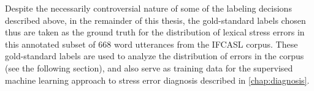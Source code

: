 		Despite the necessarily controversial nature of some of the labeling decisions described above, in the remainder of this thesis, the gold-standard labels chosen thus are taken as the ground truth for the distribution of lexical stress errors in this annotated subset of  668 word utterances from the IFCASL corpus. These gold-standard labels are used to analyze the distribution of errors in the corpus (see the following section), and also serve as training data for the supervised machine learning approach to stress error diagnosis described in  \cref{chap:diagnosis}. 
		
		
	
		
